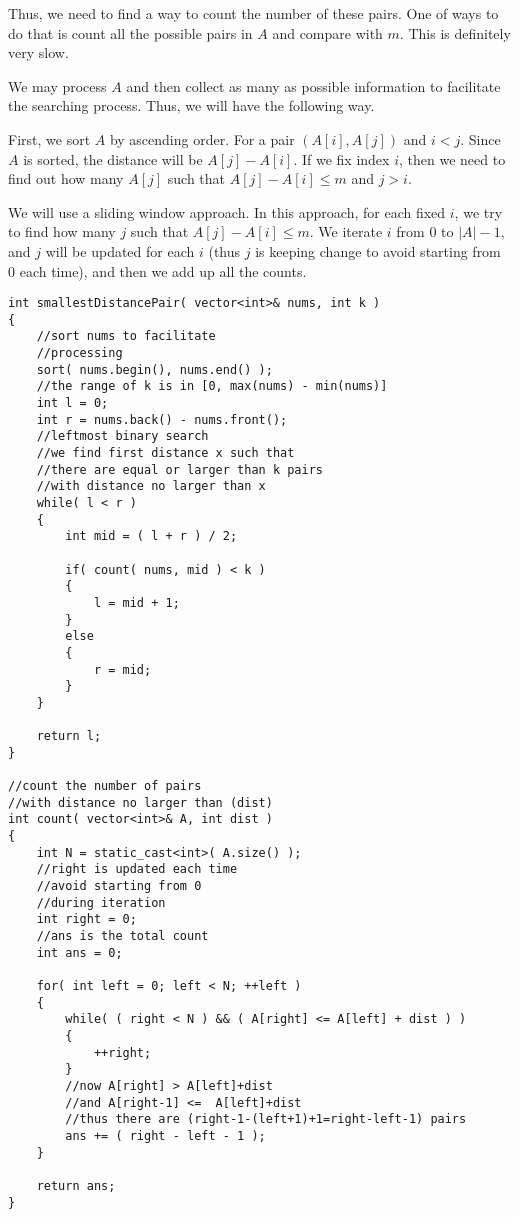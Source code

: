 Thus, we need to find a way to count the number of these pairs. One of ways to do that is count all the possible pairs in $A$ and compare with $m$. This is definitely very slow.

We may process $A$ and then collect as many as possible information to facilitate the searching process. Thus, we will have the following way.

First, we sort $A$ by ascending order. For a pair $(A[i], A[j])$ and $i<j$. Since $A$ is sorted, the distance will be $A[j]-A[i]$. If we fix index $i$, then we need to find out how many $A[j]$ such that $A[j] - A[i] \leq m$ and $j > i$. 

We will use a sliding window approach. In this approach, for each fixed $i$, we try to find how many $j$ such that $A[j] - A[i]\leq m$. We iterate $i$ from 0 to $\lvert A\rvert -1$, and $j$ will be updated for each $i$ (thus $j$ is keeping change to avoid starting from 0 each time), and then we add up all the counts.

\setcounter{lstlisting}{0}
\begin{lstlisting}[style=customc, caption={Binary Search With Sliding Window}]
int smallestDistancePair( vector<int>& nums, int k )
{
    //sort nums to facilitate
    //processing
    sort( nums.begin(), nums.end() );
    //the range of k is in [0, max(nums) - min(nums)]
    int l = 0;
    int r = nums.back() - nums.front();
    //leftmost binary search
    //we find first distance x such that
    //there are equal or larger than k pairs
    //with distance no larger than x
    while( l < r )
    {
        int mid = ( l + r ) / 2;

        if( count( nums, mid ) < k )
        {
            l = mid + 1;
        }
        else
        {
            r = mid;
        }
    }

    return l;
}

//count the number of pairs
//with distance no larger than (dist)
int count( vector<int>& A, int dist )
{
    int N = static_cast<int>( A.size() );
    //right is updated each time
    //avoid starting from 0
    //during iteration
    int right = 0;
    //ans is the total count
    int ans = 0;

    for( int left = 0; left < N; ++left )
    {
        while( ( right < N ) && ( A[right] <= A[left] + dist ) )
        {
            ++right;
        }
        //now A[right] > A[left]+dist
        //and A[right-1] <=  A[left]+dist
        //thus there are (right-1-(left+1)+1=right-left-1) pairs
        ans += ( right - left - 1 );
    }

    return ans;
}
\end{lstlisting}

